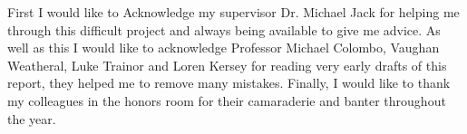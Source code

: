 First I would like to Acknowledge my supervisor Dr. Michael Jack for helping me through this difficult project and always being available to give me advice. As well as this I would like to acknowledge Professor Michael Colombo, Vaughan Weatheral, Luke Trainor and Loren Kersey for reading very early drafts of this report, they helped me to remove many mistakes. Finally, I would like to thank my colleagues in the honors room for their camaraderie and banter throughout the year.
